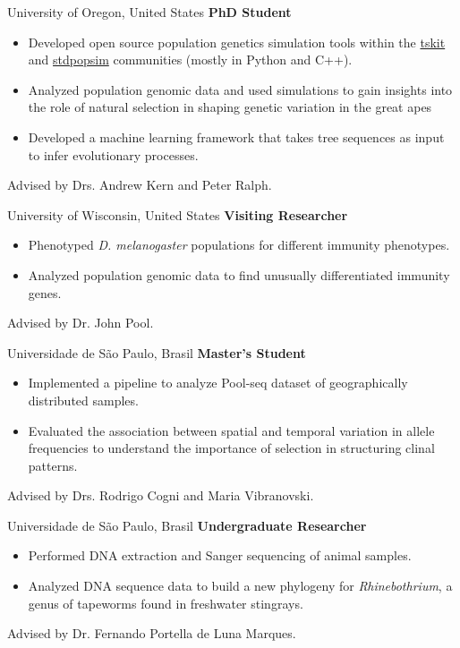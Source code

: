 	{%
		University of Oregon, United States
    }
	{%
		\textbf{PhD Student}
    }
	{%
        \begin{itemize}
            \item Developed open source population genetics simulation tools within the \href{https://tskit.dev/software/}{tskit} and \href{https://popsim-consortium.github.io/stdpopsim-docs/stable/index.html}{stdpopsim} communities (mostly in Python and C++). 
            \item Analyzed population genomic data and used simulations to gain insights into the role of natural selection in shaping genetic variation in the great apes
            \item Developed a machine learning framework that takes tree sequences as input to infer evolutionary processes.
        \end{itemize}
        {\footnotesize Advised by Drs. Andrew Kern and Peter Ralph.}
    }

	{%
		University of Wisconsin, United States
    }
	{%
		\textbf{Visiting Researcher}
    }
	{%
        \begin{itemize}
            \item Phenotyped \textit{D. melanogaster} populations for different immunity phenotypes.
            \item Analyzed population genomic data to find unusually differentiated immunity genes.
        \end{itemize}
        {\footnotesize Advised by Dr. John Pool.}
    }

	{%
		Universidade de São Paulo, Brasil
    }
	{%
		\textbf{Master's Student}
    }
	{%
        \begin{itemize}
            \item Implemented a pipeline to analyze Pool-seq dataset of geographically distributed samples.
            \item Evaluated the association between spatial and temporal variation in allele frequencies to understand the importance of selection in structuring clinal patterns.
        \end{itemize}
        {\footnotesize Advised by Drs. Rodrigo Cogni and Maria Vibranovski.}
    }

	{%
		Universidade de São Paulo, Brasil
    }
	{%
		\textbf{Undergraduate Researcher}
    }
	{%
        \begin{itemize}
            \item Performed DNA extraction and Sanger sequencing of animal samples.
            \item Analyzed DNA sequence data to build a new phylogeny for \textit{Rhinebothrium}, a genus of tapeworms found in freshwater stingrays.
        \end{itemize}
        {\footnotesize Advised by Dr. Fernando Portella de Luna Marques.}
    }

